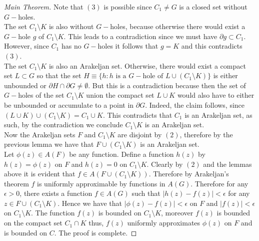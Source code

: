 \documentclass[10pt,a4paper]{amsart}
\begin{document}
\begin{proof}[Main Theorem]
\noindent Note that $(3)$ is possible since $C_1\not=G$ is a closed set without $G-$holes.\\
 The set $C_1\setminus K$ is also without $G-$holes, because otherwise there would exist a $G-$hole $g$ of $C_1\setminus K$. This leads to a contradiction since we must have $\partial g\subset C_1$. However, since $C_1$ has no $G-$holes it follows that $g=K$ and this contradicts $(3)$.\\
 The set $C_1\setminus K$ is also an Arakeljan set. Otherwise, there would exist a compact set $L\subset G$ so that the set $H\equiv \lbrace h: h \text{ is a }G-\text{hole of }L\cup(C_1\setminus K)\rbrace$ is either unbounded or $\partial H\cap \partial G\not=\emptyset$. But this is a contradiction because then the set of $G-$holes of the set $C_1\setminus K$ union the compact set $L\cup K$ would also have to either be unbounded or accumulate to a point in $\partial G$. Indeed, the claim follows, since $(L\cup K)\cup (C_1\setminus K)=C_1\cup K$. This contradicts that $C_1$ is an Arakeljan set, as such, by the contradiction we conclude $C_1\setminus K$ is an Arakeljan set.\\
 Now the Arakeljan sets $F$ and $C_1\setminus K$ are disjoint by $(2)$, therefore by the previous lemma we have that $F\cup (C_1\setminus K)$ is an Arakeljan set. \\
 Let $\phi(z)\in A(F)$ be any function. Define a function $h(z)$ by $h(z)=\phi(z)$ on $F$ and $h(z)=0$ on $C_1\setminus K$. Clearly by $(2)$ and the lemmas above it is evident that $f\in A(F\cup (C_1\setminus K))$. Therefore by Arakeljan's theorem $f$ is uniformly approximable by functions in $A(G)$. Therefore for any $\epsilon>0$, there exists a function $f\in A(G)$ such that $|h(z)-f(z)|<\epsilon$ for any $z\in F\cup (C_1\setminus K)$. Hence we have that $|\phi(z)-f(z)|<\epsilon$ on $F$ and $|f(z)|<\epsilon$ on $C_1\setminus K$. The function $f(z)$ is bounded on $C_1\setminus K$, moreover $f(z)$ is bounded on the compact set $C_1\cap K$ thus, $f(z)$ uniformly approximates $\phi(z)$ on $F$ and is bounded on $C$. The proof is complete.
\end{proof}
\end{document}
